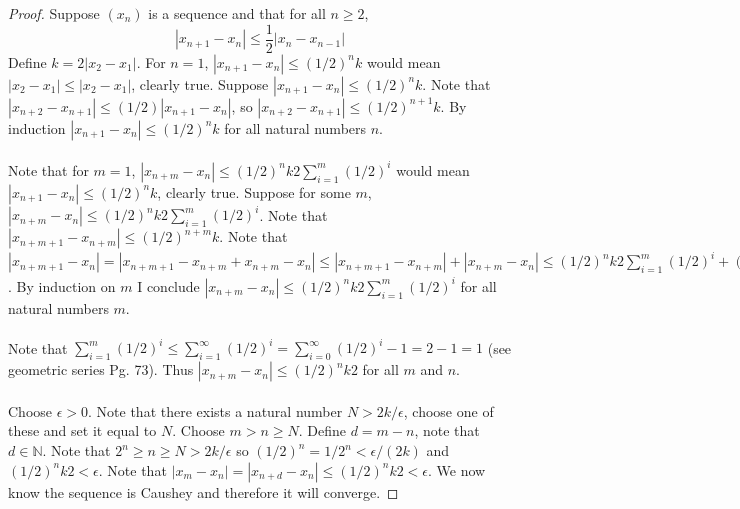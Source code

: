 \documentclass[12pt]{article}
\theoremstyle{homework}
\begin{document}
\begin{proof}
Suppose $(x_n)$ is a sequence and that for all $n \geq 2$,
$$|x_{n+1} - x_n| \leq\frac{1}{2}|x_n - x_{n-1}|$$
Define $k=2|x_2-x_1|$.  For $n=1$, $|x_{n+1} - x_n|\leq (1/2)^nk$ would mean $|x_2-x_1|\leq |x_2-x_1|$, clearly true.  Suppose $|x_{n+1} - x_n|\leq (1/2)^nk$.  Note that $|x_{n+2} - x_{n+1}| \leq(1/2)|x_{n+1} - x_{n}|$, so $|x_{n+2} - x_{n+1}|\leq (1/2)^{n+1}k$.  By induction $|x_{n+1} - x_n|\leq (1/2)^nk$ for all natural numbers $n$.\\\\
Note that for $m=1$, $|x_{n+m} - x_n|\leq (1/2)^nk2\sum_{i=1}^m(1/2)^i$ would mean $|x_{n+1} - x_n|\leq (1/2)^nk$, clearly true.  Suppose for some $m$, $|x_{n+m} - x_n|\leq (1/2)^nk2\sum_{i=1}^m(1/2)^i$.  Note that $|x_{n+m+1} - x_{n+m}|\leq (1/2)^{n+m}k$.  Note that $|x_{n+m+1} - x_n|=|x_{n+m+1} - x_{n+m}+x_{n+m} - x_n|\leq|x_{n+m+1} - x_{n+m}|+|x_{n+m} - x_n| \leq (1/2)^nk2\sum_{i=1}^m(1/2)^i+(1/2)^{n+m}k=(1/2)^nk2(\sum_{i=1}^m(1/2)^i+(1/2)^{m+1})=(1/2)^nk2\sum_{i=1}^{m+1}(1/2)^i$.  By induction on $m$ I conclude $|x_{n+m} - x_n|\leq (1/2)^nk2\sum_{i=1}^m(1/2)^i$ for all natural numbers $m$.\\\\
Note that $\sum_{i=1}^m(1/2)^i\leq \sum_{i=1}^{\infty}(1/2)^i=\sum_{i=0}^{\infty}(1/2)^i-1=2-1=1$ (see geometric series Pg. 73).  Thus $|x_{n+m} - x_n|\leq (1/2)^nk2$ for all $m$ and $n$.\\\\
Choose $\epsilon>0$.  Note that there exists a natural number $N>2k/\epsilon$, choose one of these and set it equal to $N$.  Choose $m>n\geq N$.  Define $d=m-n$, note that $d\in\mathbb{N}$.  Note that $2^n\geq n\geq N>2k/\epsilon$ so $(1/2)^n=1/2^n<\epsilon/(2k)$ and $(1/2)^nk2<\epsilon$.  Note that $|x_m - x_n|=|x_{n+d} - x_n|\leq (1/2)^nk2<\epsilon$.  We now know the sequence is Caushey and therefore it will converge.
\end{proof}
\end{document}
